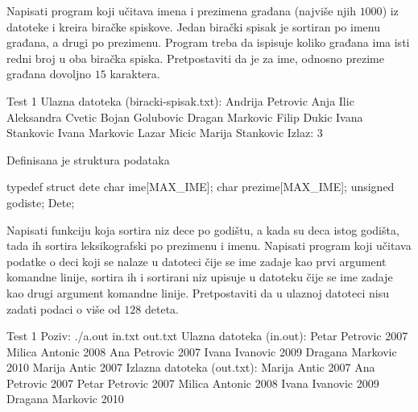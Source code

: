 \begin{Answer}[ref=508]
\end{Answer}
\begin{Exercise}[label=509]
  Napisati program koji učitava imena i prezimena građana (najviše
  njih $1000$) iz datoteke  i kreira
  biračke spiskove. Jedan birački spisak je sortiran po imenu građana,
  a drugi po prezimenu. Program treba da ispisuje koliko građana ima
  isti redni broj u oba biračka spiska. Pretpostaviti da je za ime,
  odnosno prezime građana dovoljno $15$ karaktera.

\begin{maxitest}
\begin{test}{Test 1}
Ulazna datoteka (biracki-spisak.txt):
  Andrija Petrovic
  Anja Ilic
  Aleksandra Cvetic
  Bojan Golubovic
  Dragan Markovic
  Filip Dukic
  Ivana Stankovic
  Ivana Markovic
  Lazar Micic
  Marija Stankovic
Izlaz: 3
\end{test}
\end{maxitest}
  
\end{Exercise}

\begin{Answer}[ref=509]
\end{Answer}
\begin{Exercise}[label=510]
  Definisana je struktura podataka
\begin{ckod}
typedef struct dete
{
      char ime[MAX_IME];
      char prezime[MAX_IME];
      unsigned godiste;
} Dete;
\end{ckod}
Napisati funkciju koja sortira niz dece po godištu, a kada su deca
istog godišta, tada ih sortira leksikografski po prezimenu i
imenu. Napisati program koji učitava podatke o deci koji se nalaze u
datoteci čije se ime zadaje kao prvi argument komandne linije,
sortira ih i sortirani niz upisuje u datoteku čije se ime zadaje kao
drugi argument komandne linije. Pretpostaviti da u ulaznoj datoteci
nisu zadati podaci o više od $128$ deteta.
  
\begin{miditest}
\begin{test}{Test 1}
Poziv: ./a.out in.txt out.txt
Ulazna datoteka (in.out):
  Petar Petrovic 2007
  Milica Antonic 2008
  Ana Petrovic 2007
  Ivana Ivanovic 2009
  Dragana Markovic 2010
  Marija Antic 2007
Izlazna datoteka (out.txt):
  Marija Antic 2007
  Ana Petrovic 2007
  Petar Petrovic 2007
  Milica Antonic 2008
  Ivana Ivanovic 2009
  Dragana Markovic 2010
\end{test}
\end{miditest}
  
\end{Exercise}

